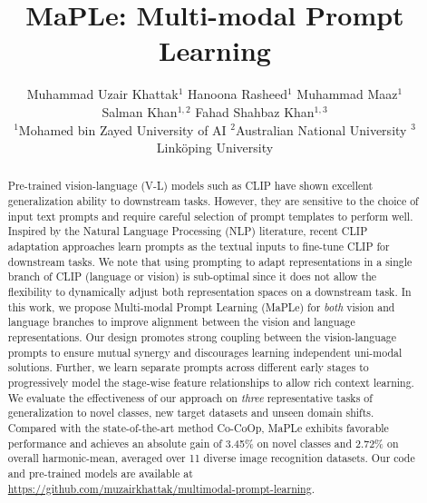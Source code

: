 \documentclass[10pt,twocolumn,letterpaper]{article}
\begin{document}
\title{{MaPLe}: \textbf{M}ulti-mod\textbf{a}l \textbf{P}rompt \textbf{Le}arning}




 \author{
  Muhammad Uzair Khattak$^{1}$ \quad 
  Hanoona Rasheed$^{1}$ \quad 
  Muhammad Maaz$^{1}$ \\
  Salman Khan$^{1,2}$ \quad
  Fahad Shahbaz Khan$^{1,3}$
  \vspace{0.2em} \\
  $^{1}$Mohamed bin Zayed University of AI \quad 
  $^{2}$Australian National University \quad 
  $^{3}$Link\"{o}ping University
}

\maketitle
\begin{abstract}


Pre-trained vision-language (V-L) models such as CLIP have shown excellent generalization ability to downstream tasks. However, they are sensitive to the choice of input text prompts and require careful selection of prompt templates to perform well. Inspired by the Natural Language Processing (NLP) literature, recent CLIP adaptation approaches learn prompts as the textual inputs to fine-tune CLIP for downstream tasks. We note that using prompting to adapt representations in a single branch of CLIP (language or vision) is sub-optimal since it does not allow the flexibility to dynamically adjust both representation spaces on a downstream task. In this work, we propose Multi-modal Prompt Learning (MaPLe) for \emph{both} vision and language branches to improve alignment between the vision and language representations. Our design promotes strong coupling between the vision-language prompts to ensure mutual synergy and discourages learning independent uni-modal solutions. Further, we learn separate prompts across different early stages to progressively model the stage-wise feature relationships to allow rich context learning. We evaluate the effectiveness of our approach on \emph{three} representative tasks of generalization to novel classes, new target datasets and unseen domain shifts. {Compared with the state-of-the-art method Co-CoOp, MaPLe exhibits favorable performance and achieves an absolute gain of 3.45\% on novel classes and 2.72\% on overall harmonic-mean, averaged over 11 diverse image recognition datasets.} Our code and pre-trained models are available at \href{https://github.com/muzairkhattak/multimodal-prompt-learning}{https://github.com/muzairkhattak/multimodal-prompt-learning}.
\end{abstract}
\end{document}
